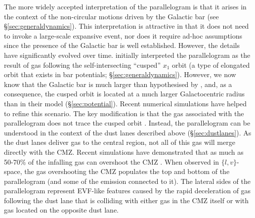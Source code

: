 The more widely accepted interpretation of the parallelogram is that it arises in the context of the non-circular motions driven by the Galactic bar (see \S\ref{sec:generaldynamics}). This interpretation is attractive in that it does not need to invoke a large-scale expansive event, nor does it require ad-hoc assumptions since the presence of the Galactic bar is well established. However, the details have significantly evolved over time. \citet{Binney1991} initially interpreted the parallelogram as the result of gas following the self-intersecting ``cusped'' $x_1$ orbit (a type of elongated orbit that exists in bar potentials; \S\ref{sec:generaldynamics}). However, we now know that the Galactic bar is much larger than hypothesised by \cite{Binney1991}, and, as a consequence, the cusped orbit is located at a much larger Galactocentric radius than in their model (\S\ref{sec:potential}). Recent numerical simulations have helped to refine this scenario. The key modification is that the gas associated with the parallelogram does not trace the cusped orbit \citep[][]{Fux1999, Sormani2018b}. Instead, the parallelogram can be understood in the context of the dust lanes described above (\S\ref{sec:dustlanes}). As the dust lanes deliver gas to the central region, not all of this gas will merge directly with the CMZ. Recent simulations have demonstrated that as much as 50-70\% of the infalling gas can overshoot the CMZ \citep{Hatchfield2021}. When observed in $\{l,v\}$-space, the gas overshooting the CMZ populates the top and bottom of the parallelogram (and some of the emission connected to it). 
The lateral sides of the parallelogram represent EVF-like features caused by the rapid deceleration of gas following the dust lane that is colliding with either gas in the CMZ itself or with gas located on the opposite dust lane.


